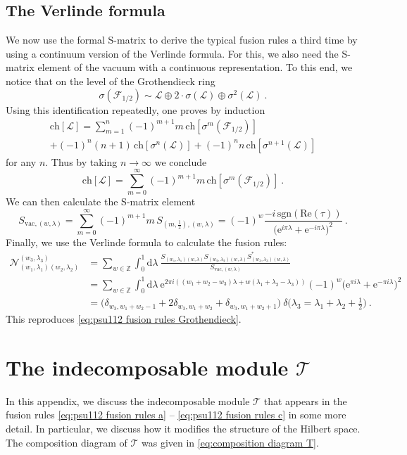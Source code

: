 \documentclass[12pt,a4paper]{article}
\newcommand{\be}{\begin{equation}}
\newcommand{\ee}{\end{equation}}
\begin{document}
\subsection{The Verlinde formula} \label{subapp:verlinde}
We now use the formal S-matrix to derive the typical fusion rules a third time by using a continuum version of the Verlinde formula. For this, we also need the S-matrix element of the vacuum with a continuous representation. To this end, we notice that on the level of the Grothendieck ring
\be 
\sigma(\mathscr{F}_{1/2}) \sim\mathscr{L} \oplus 2\cdot \sigma(\mathscr{L} )\oplus \sigma^2(\mathscr{L})\ .
\ee
Using this identification repeatedly, one proves by induction
\begin{multline} 
\mathrm{ch}[\mathscr{L}]=\sum_{m=1}^n (-1)^{m+1} m\, \mathrm{ch}[\sigma^m(\mathscr{F}_{1/2})]\\+(-1)^n(n+1)\,\mathrm{ch}[\sigma^n(\mathscr{L})] +(-1)^n n\, \mathrm{ch}[\sigma^{n+1}(\mathscr{L})]
\end{multline}
for any $n$. Thus by taking $n \to \infty$ we conclude
\be 
\mathrm{ch}[\mathscr{L}]=\sum_{m=0}^\infty  (-1)^{m+1} m\, \mathrm{ch}[\sigma^{m}(\mathscr{F}_{1/2})]\ .
\ee
We can then calculate the S-matrix element
\be 
S_{\mathrm{vac},(w,\lambda)}=\sum_{m=0}^\infty (-1)^{m+1} m\, S_{(m,\frac{1}{2}),(w,\lambda)}=(-1)^w\frac{-i\, \mathrm{sgn}(\mathrm{Re}(\tau))}{\big(\mathrm{e}^{i\pi \lambda}+\mathrm{e}^{-i\pi \lambda}\big)^2}\ .
\ee
Finally, we use the Verlinde formula to calculate the fusion rules:
\begin{align} 
\mathcal{N}_{(w_1,\lambda_1)(w_2,\lambda_2)}^{(w_3,\lambda_3)}&=\sum_{w \in \mathds{Z}} \int_0^1 \mathrm{d}\lambda\ \frac{S_{(w_1,\lambda_1)(w,\lambda)} S_{(w_2,\lambda_2)(w,\lambda)}S_{(w_3,\lambda_3)(w,\lambda)}^*}{S_{\mathrm{vac},(w,\lambda)}} \\
&=\sum_{w\in \mathds{Z}} \int_0^1 \mathrm{d}\lambda\ \mathrm{e}^{2\pi i((w_1+w_2-w_3)\lambda+w(\lambda_1+\lambda_2-\lambda_3))} (-1)^w\big(\mathrm{e}^{\pi i \lambda}+\mathrm{e}^{-\pi i \lambda}\big)^2\\
&=\Big(\delta_{w_3,w_1+w_2-1}+2\delta_{w_3,w_1+w_2}+\delta_{w_3,w_1+w_2+1}\Big) \ \delta\Big(\lambda_3=\lambda_1+\lambda_2+\tfrac{1}{2}\Big)\ .
\end{align}
This reproduces \eqref{eq:psu112 fusion rules Grothendieck}.

\section{The indecomposable module $\boldsymbol{\mathscr{T}}$} \label{app:T details}
In this appendix, we discuss the indecomposable module $\mathscr{T}$ that appears in the fusion rules \eqref{eq:psu112 fusion rules a} -- \eqref{eq:psu112 fusion rules c} in some more detail. In particular, we discuss how it modifies the structure of the Hilbert space. The composition diagram of $\mathscr{T}$ was given in \eqref{eq:composition diagram T}. 
\end{document}
